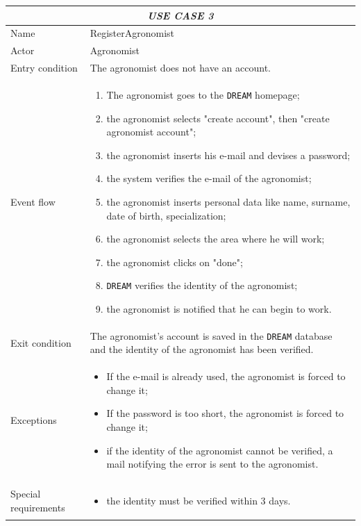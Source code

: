 \documentclass{article}
\begin{document}
\centering
\begin{longtable}{|p{3.5cm}|m{8cm}|}
 \hline
 \multicolumn{2}{|c|}{\cellcolor{white}\emph{USE CASE 3}} \\
 \endfirsthead
 \endhead
 \endfoot
 \endlastfoot
 \hline
 Name & RegisterAgronomist\\
 \hline
 Actor & Agronomist\\
 \hline
 Entry condition & The agronomist does not have an account.\\
 \hline
 Event flow & \begin{enumerate}
    \item The agronomist goes to the \verb|DREAM| homepage;
    \item the agronomist selects "create account", then "create agronomist account";
    \item the agronomist inserts his e-mail and devises a password;
    \item the system verifies the e-mail of the agronomist;
    \item the agronomist inserts personal data like name, surname, date of birth, specialization;
    \item the agronomist selects the area where he will work;
    \item the agronomist clicks on "done";
    \item \verb|DREAM| verifies the identity of the agronomist;
    \item the agronomist is notified that he can begin to work.
 \end{enumerate}\\
 \hline
 Exit condition & The agronomist's account is saved in the \verb|DREAM| database and the identity of the agronomist has been verified.\\
 \hline
 Exceptions & \begin{itemize}
     \item If the e-mail is already used, the agronomist is forced to change it;
     \item If the password is too short, the agronomist is forced to change it;
     \item if the identity of the agronomist cannot be verified, a mail notifying the error is sent to the agronomist.
 \end{itemize}\\
 \hline
 Special requirements & \begin{itemize}
     \item the identity must be verified within 3 days.
 \end{itemize}\\
 \hline
\end{longtable}
\end{document}
